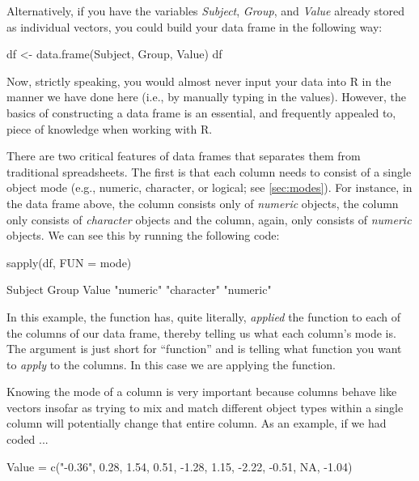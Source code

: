 \noindent
Alternatively, if you have the variables \textit{Subject}, \textit{Group}, and \textit{Value} already stored as individual vectors, you could build your data frame in the following way:

\begin{inR}
df <- data.frame(Subject, Group, Value)
df
\end{inR}

Now, strictly speaking, you would almost never input your data into R in the manner we have done here (i.e., by manually typing in the values). However, the basics of constructing a data frame is an essential, and frequently appealed to, piece of knowledge when working with R.

There are two critical features of data frames that separates them from traditional spreadsheets.  The first is that each column needs to consist of a single object mode (e.g., numeric, character, or logical; see \ref{sec:modes}). For instance, in the data frame above, the  column consists only of \textit{numeric} objects, the  column only consists of \textit{character} objects and the  column, again, only consists of \textit{numeric} objects. We can see this by running the following code:

\begin{inR}
sapply(df, FUN = mode) 
\end{inR}

\begin{outR}
     Subject       Group       Value 
  "numeric" "character"   "numeric"    
\end{outR}

In this example, the  function has, quite literally, \textit{applied} the function  to each of the columns of our data frame, thereby telling us what each column's mode is. The argument  is just short for ``function'' and is telling  what function you want to \textit{apply} to the columns. In this case we are applying the  function. 

Knowing the mode of a column is very important because columns behave like vectors insofar as trying to mix and match different object types within a single column will potentially change that entire column.  As an example, if we had coded ... 

\begin{inR}
Value = c("-0.36", 0.28, 1.54, 0.51, -1.28, 1.15, -2.22, -0.51, NA, -1.04)
\end{inR}

